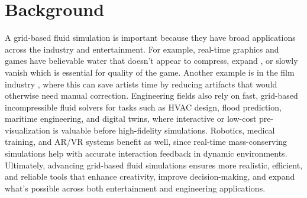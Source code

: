 \section{Background}
\label{sec:background}

A grid-based fluid simulation is important because they 
have broad applications across the industry and entertainment. For 
example, real-time graphics and games have believable 
water that doesn’t appear to compress, expand
, or slowly vanish which is essential for quality of 
the game. Another example is in the film industry
, where this can save artists time by reducing artifacts 
that would otherwise need manual correction. Engineering fields also 
rely on fast, grid-based incompressible fluid solvers 
for tasks such as HVAC design, flood prediction, 
maritime engineering, and digital twins, where interactive or low-cost pre-visualization is 
valuable before high-fidelity simulations. Robotics, medical training, and AR/VR systems benefit as well,
since real-time mass-conserving simulations help with accurate interaction feedback in dynamic environments. 
Ultimately, advancing grid-based fluid simulations ensures more realistic, efficient, and reliable tools that 
enhance creativity, improve decision-making, and expand what’s possible across both entertainment and engineering applications.
